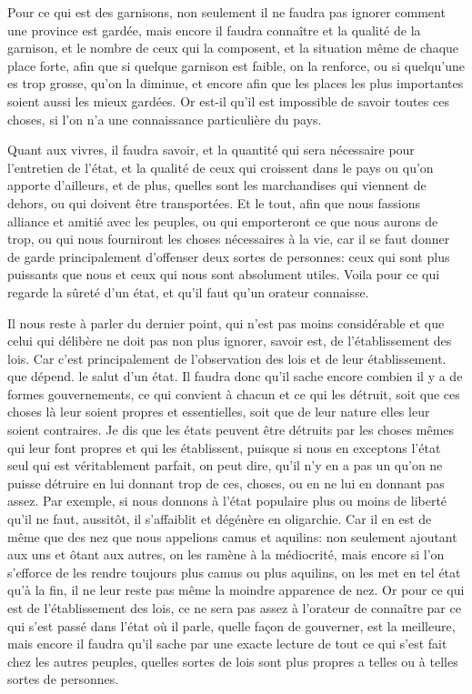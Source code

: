 Pour ce qui est des garnisons, non seulement il ne faudra pas ignorer comment une province est gardée, mais encore il faudra connaître
et la qualité de la garnison, et le nombre de ceux qui la composent, et la situation même de chaque place forte, afin que si quelque
garnison est faible, on la renforce, ou si quelqu'une es trop grosse, qu'on la diminue, et encore afin que les places les plus
importantes soient aussi les mieux gardées. Or est-il qu'il est impossible de savoir toutes ces choses, si l'on n'a une connaissance
particulière du pays.

Quant aux vivres, il faudra savoir, et la quantité qui sera nécessaire pour l'entretien de l'état, et la qualité de ceux qui croissent
dans le pays ou qu'on apporte d'ailleurs, et de plus, quelles sont les marchandises qui viennent de dehors, ou qui doivent être transportées.
Et le tout, afin que nous fassions alliance et amitié avec les peuples, ou qui emporteront ce que nous aurons de trop, ou qui nous fourniront
les choses nécessaires à la vie, car il se faut donner de garde principalement d'offenser deux sortes de personnes: ceux qui sont plus
puissants que nous et ceux qui nous sont absolument utiles. Voila pour ce qui regarde la sûreté d'un état, et qu'il faut qu'un orateur connaisse.

\bigbreak

Il nous reste à parler du dernier point, qui n'est pas moins considérable et que celui qui délibère ne doit pas non plus ignorer, savoir est,
de l'établissement des lois. Car c'est principalement de l'observation des lois et de leur établissement. que dépend. le salut d'un état. Il
faudra donc qu'il sache encore combien il y a de formes gouvernements, ce qui convient à chacun et ce qui les détruit, soit que ces choses là
leur soient propres et essentielles, soit que de leur nature elles leur soient contraires. Je dis que les états peuvent être détruits par les
choses mêmes qui leur font propres et qui les établissent, puisque si nous en exceptons l'état seul qui est véritablement parfait, on peut dire,
qu'il n'y en a pas un qu'on ne puisse détruire en lui donnant trop de ces, choses, ou en ne lui en donnant pas assez. Par exemple, si nous
donnons à l'état populaire plus ou moins de liberté qu'il ne faut, aussitôt, il s'affaiblit et dégénère en oligarchie. Car il en est de même que
des nez que nous appelions camus et aquilins: non seulement ajoutant aux uns et ôtant aux autres, on les ramène à la médiocrité, mais encore si
l'on s'efforce de les rendre toujours plus camus ou plus aquilins, on les met en tel état qu'à la fin, il ne leur reste pas même la moindre
apparence de nez. Or pour ce qui est de l'établissement des lois, ce ne sera pas assez à l'orateur de connaître par ce qui s'est passé dans l'état
où il parle, quelle façon de gouverner, est la meilleure, mais encore il faudra qu'il sache par une exacte lecture de tout ce qui s'est fait chez
les autres peuples, quelles sortes de lois sont plus propres a telles ou à telles sortes de personnes.

